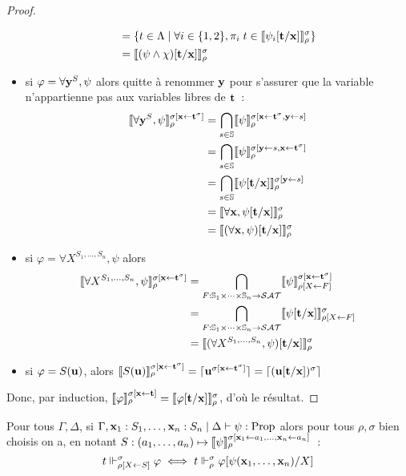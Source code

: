\documentclass{article}
\begin{document}
\begin{proof}
\begin{itemize}
\begin{align*}
      &= \{t\in\Lambda\mid\forall i \in \{1,2\}, \pi_i\;t\in\llbracket \psi_i[\mathbf{t}/\mathbf{x}] \rrbracket_\rho^\sigma\}\\
      &= \llbracket (\psi\land\chi)[\mathbf{t}/\mathbf{x}] \rrbracket_\rho^\sigma
    \end{align*}
  \item si $\varphi = \forall \mathbf{y}^S, \psi$ alors quitte à renommer $\mathbf{y}$ pour s'assurer que la variable n'appartienne pas aux variables libres de $\mathbf{t}$~:
    \begin{align*}
      \llbracket \forall \mathbf{y}^S,\psi \rrbracket_\rho^{\sigma[\mathbf{x}\leftarrow\mathbf{t}^\sigma]} &= \bigcap_{s\in \mathbb{S}}\llbracket \psi \rrbracket_\rho^{\sigma[\mathbf{x}\leftarrow\mathbf{t}^\sigma,\mathbf{y}\leftarrow s]}\\
      &= \bigcap_{s\in\mathbb{S}}\llbracket \psi \rrbracket_\rho^{\sigma[\mathbf{y}\leftarrow s, \mathbf{x}\leftarrow \mathbf{t}^\sigma]}\\
      &= \bigcap_{s\in\mathbb{S}}\llbracket \psi[\mathbf{t}/\mathbf{x}] \rrbracket_\rho^{\sigma[\mathbf{y}\leftarrow s]}\\
      &= \llbracket \forall \mathbf{x}, \psi[\mathbf{t}/\mathbf{x}] \rrbracket_\rho^\sigma\\
      &= \llbracket (\forall \mathbf{x}, \psi)[\mathbf{t}/\mathbf{x}] \rrbracket_\rho^\sigma
    \end{align*}
  \item si $\varphi = \forall X^{S_1,\ldots,S_n}, \psi$ alors
    \begin{align*}
      \llbracket \forall X^{S_1,\ldots,S_n}, \psi \rrbracket_\rho^{\sigma[\mathbf{x}\leftarrow \mathbf{t}^\sigma]} &= \bigcap_{F : \mathbb{S}_1\times\cdots\times \mathbb{S}_n\to \mathcal {SAT}}\llbracket \psi \rrbracket_{\rho[X\leftarrow F]}^{\sigma[\mathbf{x}\leftarrow \mathbf{t}^\sigma]}\\
      &= \bigcap_{F : \mathbb{S}_1\times\cdots\times \mathbb{S}_n \to \mathcal {SAT}}\llbracket \psi[\mathbf{t}/\mathbf{x}] \rrbracket_{\rho[X\leftarrow F]}^\sigma\\
      &= \llbracket (\forall X^{S_1,\ldots,S_n}, \psi)[\mathbf{t}/\mathbf{x}] \rrbracket_\rho^\sigma
    \end{align*}
  \item si $\varphi = S(\mathbf{u})$, alors $\llbracket S(\mathbf{u}) \rrbracket_\rho^{\sigma[\mathbf{x}\leftarrow \mathbf{t}^\sigma]} = \lceil \mathbf{u}^{\sigma[\mathbf{x}\leftarrow\mathbf{t}^\sigma]} \rceil = \lceil (\mathbf{u}[\mathbf{t}/\mathbf{x}])^\sigma \rceil$
  \end{itemize}
  Donc, par induction, $\llbracket \varphi \rrbracket_\rho^{\sigma[\mathbf{x}\leftarrow\mathbf{t}]} = \llbracket \varphi[\mathbf{t}/\mathbf{x}] \rrbracket_\rho^\sigma$, d'où le résultat.
\end{proof}

\begin{lem}
  Pour tous $\Gamma,\Delta$, si $\Gamma,\mathbf{x}_1 : S_1,\ldots,\mathbf{x}_n : S_n\mid\Delta\vdash \psi : \mathrm{Prop}$ alors pour tous $\rho,\sigma$ bien choisis  on a, en notant $S : (a_1,\ldots,a_n) \mapsto \llbracket \psi \rrbracket_\rho^{\sigma[\mathbf{x}_1\leftarrow a_1,\ldots,\mathbf{x}_n\leftarrow a_n]}$~:
  \[t\Vdash_{\rho[X\leftarrow S]}^\sigma \varphi \iff t\Vdash_\rho^\sigma \varphi[\psi(\mathbf{x}_1,\ldots,\mathbf{x}_n)/X]\]
\end{lem}
\end{document}
